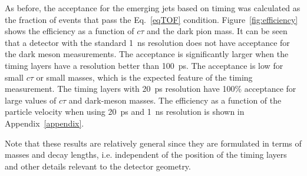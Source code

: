 As before, the acceptance for the emerging jets based on timing was calculated as the fraction of events that pass the 
Eq.~\ref{eqTOF} condition. Figure~\ref{fig:efficiency} shows the efficiency
as a function of $c\tau$ and the dark pion mass. It can be seen that a detector with the standard 1~ns resolution does
not have acceptance for the dark meson measurements. The acceptance is significantly larger when the timing layers 
 have a resolution better than 100~ps.
The acceptance is low for small $c\tau$ or small masses, which is the expected feature of the timing measurement.
The timing layers with 20~ps resolution have 100\% acceptance for large values of $c\tau$ and dark-meson masses.
The efficiency as a function of the particle velocity when using 20~ps and 1~ns resolution 
is shown in Appendix~\ref{appendix}.

Note that these results are relatively general since they are formulated in terms of masses and decay lengths,  
i.e. independent of the position of the timing layers and other details relevant to 
the detector geometry.


